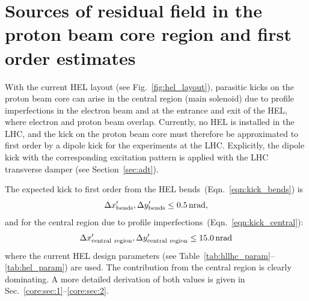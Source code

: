 \documentclass[%
 reprint,
 amsmath,amssymb,
 aps,
prstab,
]{revtex4-1}
\newcommand{\q}[2]{\ensuremath{#1\ \mathrm{#2}}} %
\begin{document}
\section{Sources of residual field in the proton beam core region and first order estimates\label{sec:core}}
With the current HEL layout (see Fig.~\ref{fig:hel_layout}), parasitic kicks on the proton beam core can arise in the central region (main solenoid) due to profile imperfections in the electron beam and at the entrance and exit of the HEL, where electron and proton beam overlap. Currently, no HEL is installed in the LHC, and the kick on the proton beam core must therefore be approximated to first order by a dipole kick for the experiments at the LHC. Explicitly, the dipole kick with the corresponding excitation pattern is applied with the LHC transverse damper (see Section~\ref{sec:adt}).

The expected kick to first order from the HEL bends~(Eqn.~\ref{eqn:kick_bends}) is
\begin{equation}
	\Delta x'_{\rm{bends}},\Delta y'_{\rm{bends}}\leq \SI{0.5}{nrad},
\end{equation}
and for the central region due to profile imperfections~(Eqn.~\ref{eqn:kick_central}):
\begin{equation}
	\Delta x'_{\rm{central \ region}}, \Delta y'_{\rm{central \ region}} \leq \SI{15.0}{nrad}
\end{equation}
where the current HEL design parameters (see Table~\ref{tab:hllhc_param}--\ref{tab:hel_param}) are used.
The contribution from the central region is clearly dominating. A more detailed derivation of both values is given in Sec.~\ref{core:sec:1}--\ref{core:sec:2}.
\end{document}
